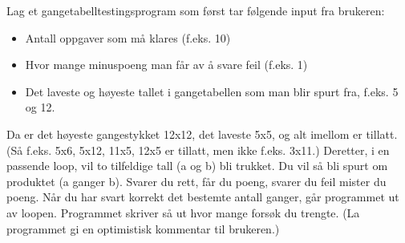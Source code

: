 %
%
Lag et gangetabelltestingsprogram som først tar følgende input fra brukeren:
\begin{itemize}
\item Antall oppgaver som må klares (f.eks. 10)
\item Hvor mange minuspoeng man får av å svare feil (f.eks. 1)
\item Det laveste og høyeste tallet i gangetabellen som man blir spurt fra, f.eks. 5 og 12.
\end{itemize}
Da er det høyeste gangestykket 12x12, det laveste 5x5, og alt imellom er tillatt. (Så f.eks. 5x6, 5x12, 11x5, 12x5 er tillatt, men ikke f.eks. 3x11.) Deretter, i en passende loop, vil to tilfeldige tall (a og b) bli trukket. Du vil så bli spurt om produktet (a ganger b). Svarer du rett, får du poeng, svarer du feil mister du poeng. Når du har svart korrekt det bestemte antall ganger, går programmet ut av loopen. Programmet skriver så ut hvor mange forsøk du trengte. (La programmet gi en optimistisk kommentar til brukeren.)
